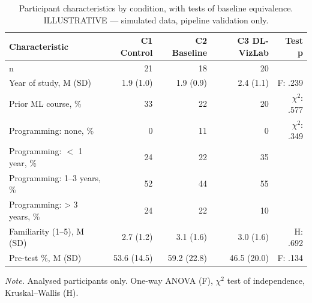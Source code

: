 \begin{table}[htbp]
\centering
\small
\caption{Participant characteristics by condition, with tests of baseline equivalence. ILLUSTRATIVE — simulated data, pipeline validation only.}
\label{tab:T01}
\begin{tabular}{lrrrr}
\toprule
Characteristic & C1 Control & C2 Baseline & C3 DL-VizLab & Test p \\
\midrule
n & 21 & 18 & 20 &  \\
Year of study, M (SD) & 1.9 (1.0) & 1.9 (0.9) & 2.4 (1.1) & F: .239 \\
Prior ML course, \% & 33 & 22 & 20 & $\chi^2$: .577 \\
Programming: none, \% & 0 & 11 & 0 & $\chi^2$: .349 \\
Programming: $<$ 1 year, \% & 24 & 22 & 35 &  \\
Programming: 1–3 years, \% & 52 & 44 & 55 &  \\
Programming: > 3 years, \% & 24 & 22 & 10 &  \\
Familiarity (1–5), M (SD) & 2.7 (1.2) & 3.1 (1.6) & 3.0 (1.6) & H: .692 \\
Pre-test \%, M (SD) & 53.6 (14.5) & 59.2 (22.8) & 46.5 (20.0) & F: .134 \\
\bottomrule
\end{tabular}
\par\smallskip\footnotesize\textit{Note.} Analysed participants only. One-way ANOVA (F), $\chi^2$ test of independence, Kruskal–Wallis (H).
\end{table}
